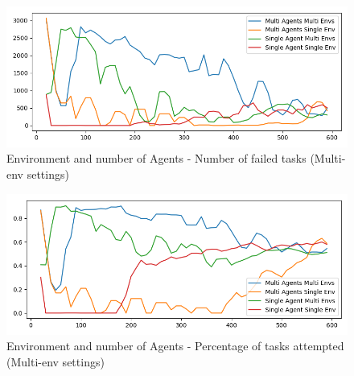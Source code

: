 \begin{figure}[H]
    \centering
    \includegraphics[width=\linewidth]{figures/5_evaluation_figs/env_agent_num_training_fig/num_failed_tasks.png}
    \caption{Environment and number of Agents - Number of failed tasks (Multi-env settings)}
    \label{fig:env_num_failed_tasks}
\end{figure}

\begin{figure}[H]
    \centering
    \includegraphics[width=\linewidth]{figures/5_evaluation_figs/env_agent_num_training_fig/percent_tasks.png}
    \caption{Environment and number of Agents - Percentage of tasks attempted (Multi-env settings)}
    \label{fig:env_percent_tasks}
\end{figure}

